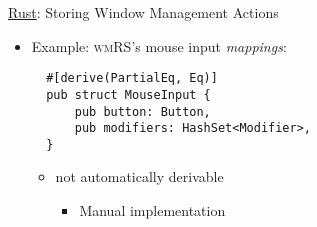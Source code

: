 \begin{frame}[fragile]{\underline{Rust}: Storing Window Management Actions \hfill {\footnotesize \currentname}}


    \begin{itemize}

        \item Example: \textsc{wmRS}'s mouse input \textit{mappings}:\\[3pt]
\begin{verbatim}
  #[derive(PartialEq, Eq)]
  pub struct MouseInput {
      pub button: Button,
      pub modifiers: HashSet<Modifier>,
  }
\end{verbatim}

    \vspace*{5pt}\begin{itemize}

        \item {} not automatically derivable
            \begin{itemize}
                \item Manual implementation
            \end{itemize}

    \end{itemize}

    \end{itemize}

    \vfill

\end{frame}


